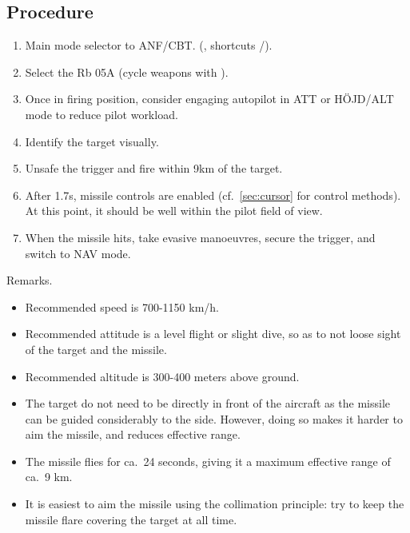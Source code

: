 \subsection{Procedure}
\begin{enumerate}
  \item Main mode selector to ANF/CBT.
    (, shortcuts /).
  \item Select the Rb 05A (cycle weapons with ).
  \item Once in firing position, consider engaging autopilot in ATT or HÖJD/ALT mode to reduce pilot workload.
  \item Identify the target visually.
  \item Unsafe the trigger and fire within 9km of the target.
  \item After 1.7s, missile controls are enabled
    (cf.\ \cref{sec:cursor} for control methods).
    At this point, it should be well within the pilot field of view.
  \item When the missile hits, take evasive manoeuvres, secure the trigger, and switch to NAV mode.
\end{enumerate}

Remarks.
\begin{itemize}
  \item Recommended speed is 700-1150 km/h.
  \item Recommended attitude is a level flight or slight dive,
    so as to not loose sight of the target and the missile.
  \item Recommended altitude is 300-400 meters above ground.
  \item The target do not need to be directly in front of the aircraft
    as the missile can be guided considerably to the side.
    However, doing so makes it harder to aim the missile, and reduces effective range.
  \item The missile flies for ca.\ 24 seconds, giving it a maximum effective range of ca.\ 9 km.
  \item It is easiest to aim the missile using the collimation principle:
    try to keep the missile flare covering the target at all time.
\end{itemize}
